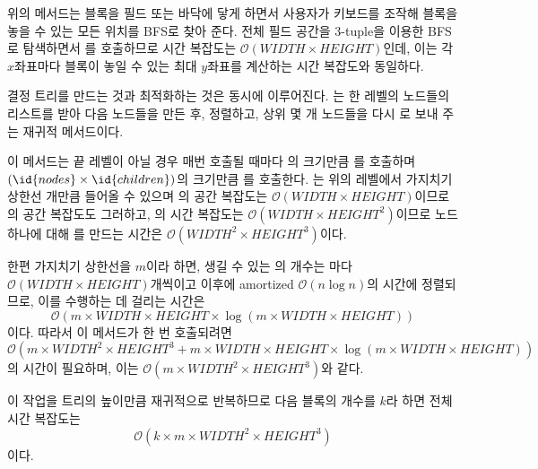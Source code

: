 위의 메서드는 블록을 필드 또는 바닥에 닿게 하면서 사용자가 키보드를 조작해 블록을 놓을 수 있는 모든
위치를 BFS로 찾아 준다. 전체 필드 공간을 3-tuple을 이용한 BFS로 탐색하면서
를 호출하므로 시간 복잡도는 $\mathcal{O}\left(WIDTH
\times HEIGHT\right)$인데, 이는 각 $x$좌표마다 블록이 놓일 수 있는 최대 $y$좌표를 계산하는
시간 복잡도와 동일하다.

결정 트리를 만드는 것과 최적화하는 것은 동시에 이루어진다. 는 한 레벨의
노드들의 리스트를 받아 다음 노드들을 만든 후, 정렬하고, 상위 몇 개 노드들을 다시 로
보내 주는 재귀적 메서드이다.

이 메서드는 끝 레벨이 아닐 경우 매번 호출될 때마다 의 크기만큼 를 호출하며
$(\id{nodes} \times \id{children})$의 크기만큼 를 호출한다. 는 위의 레벨에서 가지치기 상한선 개만큼 들어올 수 있으며
의 공간 복잡도는 $\mathcal{O}\left(WIDTH \times HEIGHT\right)$이므로
의 공간 복잡도도 그러하고, 의 시간 복잡도는 $\mathcal{O}\left(WIDTH \times HEIGHT^2\right)$이므로 
노드 하나에 대해 를 만드는 시간은 $\mathcal{O}\left(WIDTH^2 \times HEIGHT^3\right)$이다.

한편 가지치기 상한선을 $m$이라 하면, 생길 수 있는 의 개수는 마다
$\mathcal{O}\left(WIDTH \times HEIGHT\right)$개씩이고 이후에
amortized $\mathcal{O}\left(n \log n\right)$의 시간에 정렬되므로, 이를 수행하는 데 걸리는 시간은
\[\mathcal{O}\left(m \times WIDTH \times HEIGHT \times \log \left(m \times WIDTH \times HEIGHT\right)\right)\]
이다. 따라서 이 메서드가 한 번 호출되려면
\[\mathcal{O}\left(m \times WIDTH^2 \times HEIGHT^3 + m \times WIDTH \times HEIGHT \times \log \left(m \times WIDTH \times HEIGHT\right)\right)\]
의 시간이 필요하며, 이는 $\mathcal{O}\left(m \times WIDTH^2 \times HEIGHT^3\right)$와 같다.

이 작업을 트리의 높이만큼 재귀적으로 반복하므로 다음 블록의 개수를 $k$라 하면 전체 시간 복잡도는
\[\mathcal{O}\left(k \times m \times WIDTH^2 \times HEIGHT^3\right)\]
이다.

